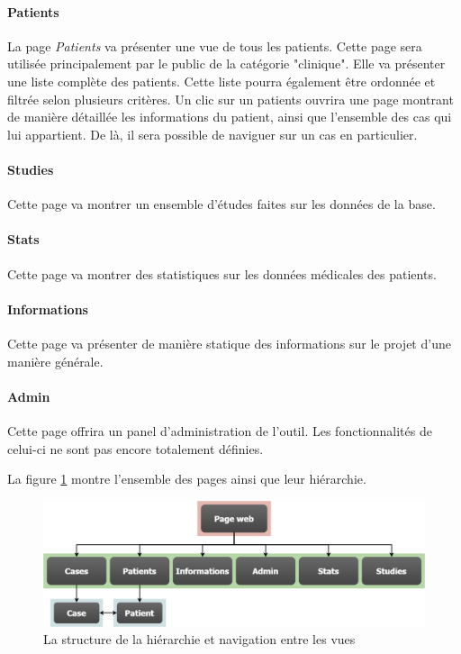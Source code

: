 		\paragraph{Patients} La page \textit{Patients} va présenter une vue de tous les patients. Cette page sera utilisée principalement par le public de la catégorie "clinique". Elle va présenter une liste complète des patients. Cette liste pourra également être ordonnée et filtrée selon plusieurs critères. Un clic sur un patients ouvrira une page montrant de manière détaillée les informations du patient, ainsi que l'ensemble des cas qui lui appartient. De là, il sera possible de naviguer sur un cas en particulier.
		\paragraph{Studies} Cette page va montrer un ensemble d'études faites sur les données de la base.
		\paragraph{Stats} Cette page va montrer des statistiques sur les données médicales des patients.
		\paragraph{Informations} Cette page va présenter de manière statique des informations sur le projet d'une manière générale.
		\paragraph{Admin} Cette page offrira un panel d'administration de l'outil. Les fonctionnalités de celui-ci ne sont pas encore totalement définies.

		La figure \ref{structure_navigation} montre l'ensemble des pages ainsi que leur hiérarchie.

		\begin{figure}[h]
			\centering
			\includegraphics[width=1\textwidth]{images/conception/structure_navigation}
			\caption{La structure de la hiérarchie et navigation entre les vues}
			\label{structure_navigation}
		\end{figure}

